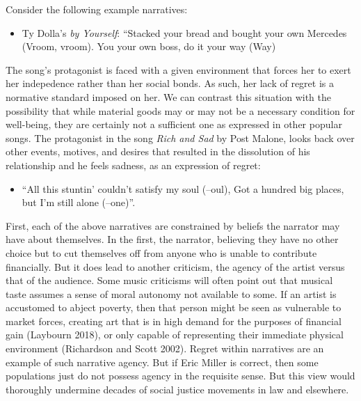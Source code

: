 \documentclass[
  letterpaper,
  DIV=11,
  numbers=noendperiod]{scrreprt}
\providecommand{\tightlist}{%
  \setlength{\itemsep}{0pt}\setlength{\parskip}{0pt}}\usepackage{longtable,booktabs,array}
\begin{document}
\begin{tcolorbox}[enhanced jigsaw, arc=.35mm, breakable, rightrule=.15mm, colback=white, colframe=quarto-callout-important-color-frame, bottomrule=.15mm, leftrule=.75mm, opacityback=0, toprule=.15mm, left=2mm]
\begin{tcolorbox}[enhanced jigsaw, arc=.35mm, breakable, rightrule=.15mm, colback=white, colframe=quarto-callout-tip-color-frame, bottomrule=.15mm, leftrule=.75mm, opacityback=0, toprule=.15mm, left=2mm]
Consider the following example narratives:

\begin{itemize}
\tightlist
\item
  Ty Dolla's \emph{by Yourself}: ``Stacked your bread and bought your
  own Mercedes (Vroom, vroom). You your own boss, do it your way (Way)
\end{itemize}

The song's protagonist is faced with a given environment that forces her
to exert her indepedence rather than her social bonds. As such, her lack
of regret is a normative standard imposed on her. We can contrast this
situation with the possibility that while material goods may or may not
be a necessary condition for well-being, they are certainly not a
sufficient one as expressed in other popular songs. The protagonist in
the song \emph{Rich and Sad} by Post Malone, looks back over other
events, motives, and desires that resulted in the dissolution of his
relationship and he feels sadness, as an expression of regret:

\begin{itemize}
\tightlist
\item
  ``All this stuntin' couldn't satisfy my soul (--oul), Got a hundred
  big places, but I'm still alone (--one)''.
\end{itemize}

First, each of the above narratives are constrained by beliefs the
narrator may have about themselves. In the first, the narrator,
believing they have no other choice but to cut themselves off from
anyone who is unable to contribute financially. But it does lead to
another criticism, the agency of the artist versus that of the audience.
Some music criticisms will often point out that musical taste assumes a
sense of moral autonomy not available to some. If an artist is
accustomed to abject poverty, then that person might be seen as
vulnerable to market forces, creating art that is in high demand for the
purposes of financial gain (Laybourn 2018), or only capable of
representing their immediate physical environment (Richardson and Scott
2002). Regret within narratives are an example of such narrative agency.
But if Eric Miller is correct, then some populations just do not possess
agency in the requisite sense. But this view would thoroughly undermine
decades of social justice movements in law and elsewhere.


\end{tcolorbox}
\end{tcolorbox}
\end{document}
